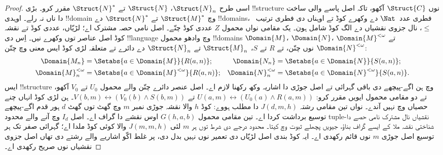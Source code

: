 \documentclass[../../../include/open-logic-section]{subfiles}
\begin{document}
\begin{proof}
اسی طرح $\Struct{N}_n$، $\Struct{N}$ تے
$\Struct{N}^*$ مقرر کرو۔ بڑی !!{structure} نوں
$\Struct{C}$ آکھو، تاکہ اصل پاسے والی ساخت دا ناں نہ رلے۔
اوہدی !!{domain} وچ $\Struct{M}^*$ تے $\Struct{N}^*$
دے !!{domain}s، فطری عدد~$\Nat$ دے وکھرے کوڈ تے اوہناں
دی فطری ترتیب~$\le$، نال جزوی نقشیاں دے الگ کوڈ شامل ہون۔
یک مقامی نواں محمول $Z$ عددی کوڈ چنّے۔ اصل نامی حصہ مشترک
اے؛ لڑیّاں، عددی کوڈ تے نقشہ کوڈ اصل عناصر توں وکھرے نیں۔
اِس دی !!{language} وچ وادھو محمول !!{domain}s
$\Domain{M}$، $\Domain{N}$، $\Domain{M}^{<\omega}$ تے
$\Domain{N}^{<\omega}$ نوں چنّن، تے $R$ تے $S$،
$\Struct{M}_n$ تے $\Struct{N}_n$ دے دائرے تے متعلقہ لڑی
کوڈ ایس معنی وچ چنّن:
\begin{align*}
  \Domain{M_n} & = \Setabs{a \in \Domain{M}}{R(a, n)}; & 
  \Domain{N_n} & = \Setabs{a \in \Domain{N}}{S(a,n)}; \\
  \Domain{M}^{<\omega}_n & = \Setabs{a \in \Domain{M}^{<\omega}}{R(a,n)}; &
  \Domain{N}^{<\omega}_n & = \Setabs{a \in \Domain{N}^{<\omega}}{S(a,n)}. 
\end{align*}
ایس !!{structure} وچ ہن اگے-پیچھے دی باقی گہرائی تے اصل جوڑی دا اشاریہ وکھ رکھنا
لازم اے۔ اصل عنصر دائرے چنّن والے محمول $U_0$ تے $V_0$
آکھو، تے دو مقامی محمول ایویں مقرر کرو:
$U(a,m)\leftrightarrow(U_0(a)\land R(a,m))$ تے
$V(b,m)\leftrightarrow(V_0(b)\land S(b,m))$۔ ہن لڑی
کوڈ انہاں چنے حصیاں وچ نہیں آندے۔ نواں تین مقامی رشتہ $J(d,m,h)$ دا مطلب ہووے:
کوڈ $h$ والا نقشہ جوڑی نمبر $m$ وچ گھٹ توں گھٹ $d$
ہور قدم اگے-پیچھے توسیع برداشت کردا اے۔ تین مقامی محمول
$G(h,a,b)$ اوس نقشے دا گراف اے۔ اصل $I_d$ وچ آنے والے
محدود tuple-نقشیاں نال مشترک نامی حصے دا شناختی نقشہ ملا کے
ایسے گراف بناؤ، جیویں پچھلے ثبوت وچ کیتا۔ محدود درجے دی شرط توں
ہر $m$ لئی $J(m,m,h)$ والا کوئی کوڈ ملدا اے؛ گہرائی صفر
تک ہر توسیع اصل جوڑی $m$ نوں قائم رکھدی اے۔ ایہ کوڈ بندی
اصل لڑیّاں دی تعمیر نوں نہیں بدل دی، پر غلط اکّو اشاریے والے
رشتے دی تھاں اصل جزوی نقشیاں نوں صریح رکھدی اے۔


\end{proof}
\end{document}
